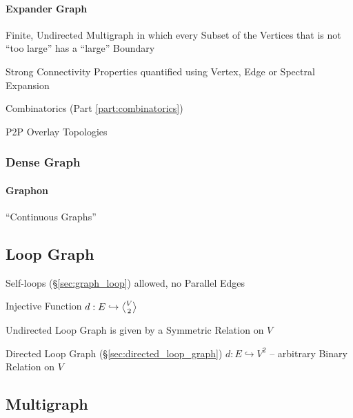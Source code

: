 \paragraph{Expander Graph}\label{sec:expander_graph}\hfill


Finite, Undirected Multigraph in which every Subset of the Vertices that is not
``too large'' has a ``large'' Boundary

Strong Connectivity Properties quantified using Vertex, Edge or Spectral
Expansion

Combinatorics (Part \ref{part:combinatorics})

P2P Overlay Topologies



\subsubsection{Dense Graph}\label{sec:dense_graph}

\paragraph{Graphon}\label{sec:graphon}

``Continuous Graphs''



\subsection{Loop Graph}\label{sec:loop_graph}

Self-loops (\S\ref{sec:graph_loop}) allowed, no Parallel Edges

Injective Function $d : E \hookrightarrow \angleover{V}{2}$

Undirected Loop Graph is given by a Symmetric Relation on $V$

Directed Loop Graph (\S\ref{sec:directed_loop_graph}) $d : E
\hookrightarrow V^2$ -- arbitrary Binary Relation on $V$



\subsection{Multigraph}\label{sec:multigraph}

